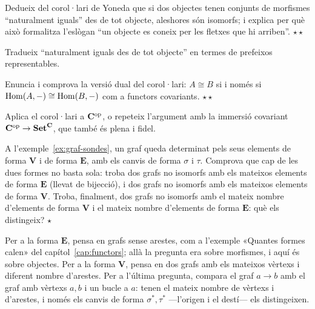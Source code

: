 \begin{exercici}
Dedueix del corol·lari de Yoneda que si dos objectes tenen conjunts de morfismes \enquote{naturalment iguals} des de tot objecte, aleshores són isomorfs; i explica per què això formalitza l'eslògan \enquote{un objecte es coneix per les fletxes que hi arriben}. \hfill{\normalfont$\star\star$}
\begin{indicacio}
Tradueix \enquote{naturalment iguals des de tot objecte} en termes de prefeixos representables.
\end{indicacio}
\end{exercici}

\begin{exercici}
Enuncia i comprova la versió dual del corol·lari: $A\cong B$ si i només si $\operatorname{Hom}(A,-)\cong\operatorname{Hom}(B,-)$ com a functors covariants. \hfill{\normalfont$\star\star$}
\begin{indicacio}
Aplica el corol·lari a $\mathbf{C}^{\mathrm{op}}$, o repeteix l'argument amb la immersió covariant $\mathbf{C}^{\mathrm{op}}\to\mathbf{Set}^{\mathbf{C}}$, que també és plena i fidel.
\end{indicacio}
\end{exercici}

\begin{exercici}
A l'exemple~\ref{ex:graf-sondes}, un graf queda determinat pels seus elements de forma $\mathbf V$ i de forma $\mathbf E$, amb els canvis de forma $\sigma$ i $\tau$. Comprova que cap de les dues formes no basta sola: troba dos grafs no isomorfs amb els mateixos elements de forma $\mathbf E$ (llevat de bijecció), i dos grafs no isomorfs amb els mateixos elements de forma $\mathbf V$. Troba, finalment, dos grafs no isomorfs amb el mateix nombre d'elements de forma $\mathbf V$ i el mateix nombre d'elements de forma $\mathbf E$: què els distingeix? \hfill{\normalfont$\star$}
\begin{indicacio}
Per a la forma $\mathbf E$, pensa en grafs sense arestes, com a l'exemple «Quantes formes calen» del capítol~\ref{cap:functors}; allà la pregunta era sobre morfismes, i aquí és sobre objectes. Per a la forma $\mathbf V$, pensa en dos grafs amb els mateixos vèrtexs i diferent nombre d'arestes. Per a l'última pregunta, compara el graf $a\to b$ amb el graf amb vèrtexs $a,b$ i un bucle a $a$: tenen el mateix nombre de vèrtexs i d'arestes, i només els canvis de forma $\sigma^*,\tau^*$ ---l'origen i el destí--- els distingeixen.
\end{indicacio}
\end{exercici}

